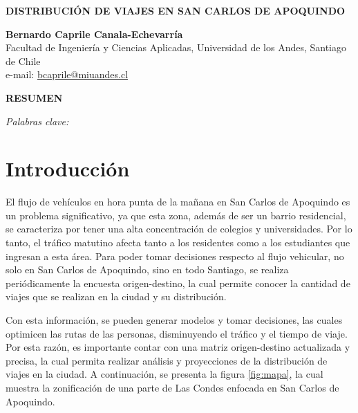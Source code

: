 \documentclass[letterpaper,12pt]{article}
\begin{document}
\begin{titlepage}
    \begin{center}
      \vspace*{1cm}

    \textbf{\Large DISTRIBUCIÓN DE VIAJES EN SAN CARLOS DE APOQUINDO}
    
    \vspace{1cm}
    
    \textbf{Bernardo Caprile Canala-Echevarría}\\
    Facultad de Ingeniería y Ciencias Aplicadas, Universidad de los Andes, Santiago de Chile\\
    e-mail: \href{mailto:bcaprile@miuandes.cl}{bcaprile@miuandes.cl}
    
    \vspace{2cm}
    
    \textbf{RESUMEN}
    
    \vspace{0.5cm}  
    \end{center}
    
    \textit{Palabras clave:}
\end{titlepage}

\newpage

\section{Introducción}

El flujo de vehículos en hora punta de la mañana en San Carlos de Apoquindo es un problema significativo, ya que esta zona, además de ser un barrio residencial, se caracteriza por tener una alta concentración de colegios y universidades. Por lo tanto, el tráfico matutino afecta tanto a los residentes como a los estudiantes que ingresan a esta área. Para poder tomar decisiones respecto al flujo vehicular, no solo en San Carlos de Apoquindo, sino en todo Santiago, se realiza periódicamente la encuesta origen-destino, la cual permite conocer la cantidad de viajes que se realizan en la ciudad y su distribución.

Con esta información, se pueden generar modelos y tomar decisiones, las cuales optimicen las rutas de las personas, disminuyendo el tráfico y el tiempo de viaje. Por esta razón, es importante contar con una matriz origen-destino actualizada y precisa, la cual permita realizar análisis y proyecciones de la distribución de viajes en la ciudad. A continuación, se presenta la figura \ref{fig:mapa}, la cual muestra la zonificación de una parte de Las Condes enfocada en San Carlos de Apoquindo. 
\end{document}
